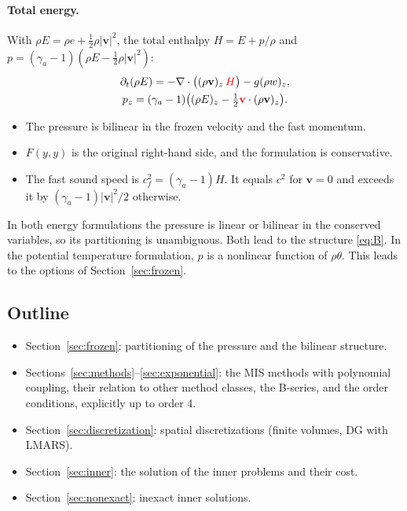 \documentclass[11pt,a4paper]{article}
\theoremstyle{definition}
\theoremstyle{remark}
\begin{document}
\paragraph{Total energy.}
With $\rho E=\rho e+\tfrac12\rho|\mathbf v|^2$, the total enthalpy
$H=E+p/\rho$ and $p=(\gamma_a-1)(\rho E-\tfrac12\rho|\mathbf v|^2)$:
\begin{gather*}
 \partial_t(\rho E)=-\nabla\cdot\big((\rho\mathbf v)_z\,\textcolor{red}{H}\big)-g(\rho w)_z,\\
 p_z=(\gamma_a-1)\big((\rho E)_z-\tfrac12\textcolor{red}{\mathbf v}\cdot(\rho\mathbf v)_z\big).
\end{gather*}
\begin{itemize}
\item The pressure is bilinear in the frozen velocity and the fast
  momentum.
\item $F(y,y)$ is the original right-hand side, and the formulation is
  conservative.
\item The fast sound speed is $c_f^2=(\gamma_a-1)H$. It equals $c^2$ for
  $\mathbf v=0$ and exceeds it by $(\gamma_a-1)|\mathbf v|^2/2$ otherwise.
\end{itemize}

In both energy formulations the pressure is linear or bilinear in the
conserved variables, so its partitioning is unambiguous. Both lead to the
structure \eqref{eq:B}. In the potential temperature formulation, $p$ is
a nonlinear function of $\rho\theta$. This leads to the options of
Section~\ref{sec:frozen}.

\subsection{Outline}

\begin{itemize}
\item Section~\ref{sec:frozen}: partitioning of the pressure and the
  bilinear structure.
\item Sections~\ref{sec:methods}--\ref{sec:exponential}: the MIS methods
  with polynomial coupling, their relation to other method classes, the
  B-series, and the order conditions, explicitly up to order 4.
\item Section~\ref{sec:discretization}: spatial discretizations (finite
  volumes, DG with LMARS).
\item Section~\ref{sec:inner}: the solution of the inner problems and
  their cost.
\item Section~\ref{sec:nonexact}: inexact inner solutions.
\end{itemize}
\end{document}
